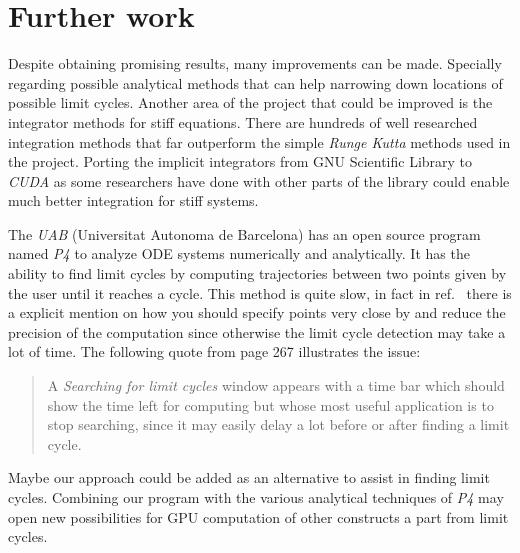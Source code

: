%
\section{Further work}%
\label{sec:future}

Despite obtaining promising results, many improvements can be made. Specially
regarding possible analytical methods that can help narrowing down locations of
possible limit cycles. Another area of the project that could be improved is the
integrator methods for stiff equations.
There are hundreds of well researched integration methods that far outperform the
simple \emph{Runge Kutta} methods used in the project.
Porting the implicit integrators from GNU Scientific Library to \emph{CUDA}
as some researchers have done with other parts of the library \cite{rodrigo_gnu_2019}
could enable much better integration for stiff systems.


The \emph{UAB} (Universitat Autonoma de Barcelona) has an open source program
named \emph{P4} \cite{saleta_oscarsaletap4_2018,saleta_computer_2018} to analyze
ODE systems numerically and analytically. It has the ability to find limit
cycles by computing trajectories between two points given by the user until it
reaches a cycle. This method is quite slow, in fact
in ref.~\cite{dumortier_examples_2006} there is a explicit mention on how you should
specify points very close by and reduce the precision of the computation since
otherwise the limit cycle detection may take a lot of time. The following quote
from page 267 illustrates the issue:

\begin{quote}
    A \emph{Searching for limit cycles} window  appears  with  a  time  bar
    which  should show the time left for computing but whose most useful
    application is to stop searching, since it may easily delay a lot before or
    after finding a limit cycle.
\end{quote}

Maybe our approach could be added as an alternative to assist in finding limit cycles.
Combining our program with the various analytical techniques of \emph{P4} may open new
possibilities for GPU computation of other constructs a part from limit cycles.
